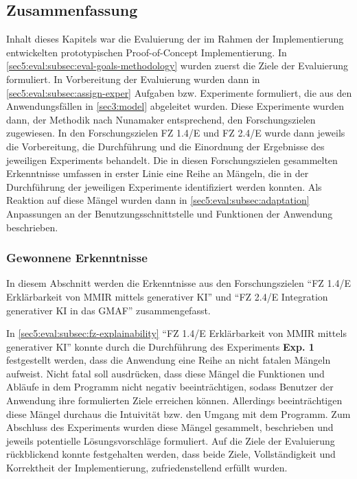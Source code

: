 \clearpage

\subsection{Zusammenfassung}
\label{sec5:eval:subsec:summary}
Inhalt dieses Kapitels war die Evaluierung der im Rahmen der Implementierung entwickelten prototypischen Proof-of-Concept Implementierung.
In \cref{sec5:eval:subsec:eval-goals-methodology} wurden zuerst die Ziele der Evaluierung formuliert.
In Vorbereitung der Evaluierung wurden dann in \cref{sec5:eval:subsec:assign-exper} Aufgaben bzw. Experimente formuliert, die aus den Anwendungsfällen in \cref{sec3:model} abgeleitet wurden.
Diese Experimente wurden dann, der Methodik nach Nunamaker entsprechend, den Forschungszielen zugewiesen.
In den Forschungszielen FZ 1.4/E und FZ 2.4/E wurde dann jeweils die Vorbereitung, die Durchführung und die Einordnung der Ergebnisse des jeweiligen Experiments behandelt.
Die in diesen Forschungszielen gesammelten Erkenntnisse umfassen in erster Linie eine Reihe an Mängeln, die in der Durchführung der jeweiligen Experimente identifiziert werden konnten.
Als Reaktion auf diese Mängel wurden dann in \cref{sec5:eval:subsec:adaptation} Anpassungen an der Benutzungsschnittstelle und Funktionen der Anwendung beschrieben.

\subsubsection{Gewonnene Erkenntnisse}
In diesem Abschnitt werden die Erkenntnisse aus den Forschungszielen \enquote{FZ 1.4/E Erklärbarkeit von MMIR mittels generativer KI} und \enquote{FZ 2.4/E Integration generativer KI in das GMAF} zusammengefasst.


In \cref{sec5:eval:subsec:fz-explainability} \enquote{FZ 1.4/E Erklärbarkeit von MMIR mittels generativer KI} konnte durch die Durchführung des Experiments \textbf{Exp. 1} festgestellt werden, dass die Anwendung eine Reihe an nicht fatalen Mängeln aufweist.
Nicht fatal soll ausdrücken, dass diese Mängel die Funktionen und Abläufe in dem Programm nicht negativ beeinträchtigen, sodass Benutzer der Anwendung ihre formulierten Ziele erreichen können.
Allerdings beeinträchtigen diese Mängel durchaus die Intuivität bzw. den Umgang mit dem Programm.
Zum Abschluss des Experiments wurden diese Mängel gesammelt, beschrieben und jeweils potentielle Lösungsvorschläge formuliert.
Auf die Ziele der Evaluierung rückblickend konnte festgehalten werden, dass beide Ziele, Vollständigkeit und Korrektheit der Implementierung, zufriedenstellend erfüllt wurden.

